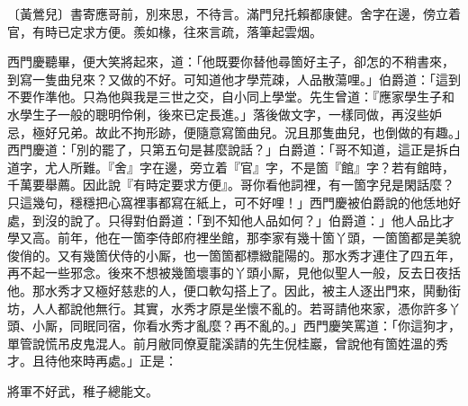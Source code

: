\begin{myquote}
{\markfont\small〔黃鶯兒〕}書寄應哥前，別來思，不待言。滿門兒托賴都康健。舍字在邊，傍立着官，有時已定求方便。羨如椽，往來言疏，落筆起雲烟。
\end{myquote}

西門慶聽畢，便大笑將起來，道：「他既要你替他尋箇好主子，卻怎的不稍書來，到寫一隻曲兒來？又做的不好。可知道他才學荒疎，人品散蕩哩。」伯爵道：「這到不要作準他。只為他與我是三世之交，自小同上學堂。先生曾道：『應家學生子和水學生子一般的聰明伶俐，後來已定長進。」落後做文字，一樣同做，再沒些妒忌，極好兄弟。故此不拘形跡，{}便隨意寫箇曲兒。況且那隻曲兒，也倒做的有趣。」西門慶道：「別的罷了，只第五句是甚麼說話？」白爵道：「哥不知道，這正是拆白道字，尤人所難。『舍』字在邊，旁立着『官』字，不是箇『館』字？若有館時，千萬要舉薦。因此說『有時定要求方便』。哥你看他詞裡，有一箇字兒是閑話麼？只這幾句，穩穩把心窩裡事都寫在紙上，可不好哩！」西門慶被伯爵說的他恁地好處，到沒的說了。只得對伯爵道：「到不知他人品如何？」伯爵道：」他人品比才學又高。前年，他在一箇李侍郎府裡坐館，那李家有幾十箇丫頭，一箇箇都是美貌俊俏的。又有幾箇伏侍的小厮，也一箇箇都標緻龍陽的。那水秀才連住了四五年，再不起一些邪念。後來不想被幾箇壞事的丫頭小厮，見他似聖人一般，反去日夜括他。那水秀才又極好慈悲的人，便口軟勾搭上了。{}因此，被主人逐出門來，鬨動街坊，人人都說他無行。其實，水秀才原是坐懷不亂的。若哥請他來家，憑你許多丫頭、小厮，同眠同宿，你看水秀才亂麼？再不亂的。」西門慶笑罵道：「你這狗才，單管說慌吊皮鬼混人。前月敝同僚夏龍溪請的先生倪桂巖，曾說他有箇姓溫的秀才。且待他來時再處。」正是：

\begin{myquote}
將軍不好武，稚子總能文。
\end{myquote}



